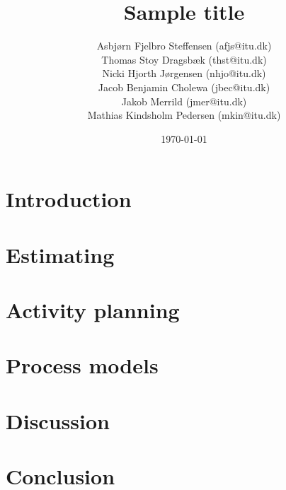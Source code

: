 \documentclass{report}
\title{Sample title}
\date{\today}
\author{Asbj\o rn Fjelbro Steffensen (afjs@itu.dk)\\ Thomas Stoy Dragsb\ae k (thst@itu.dk)\\ Nicki Hjorth J\o rgensen (nhjo@itu.dk)\\ Jacob Benjamin Cholewa (jbec@itu.dk)\\ Jakob Merrild (jmer@itu.dk)\\ Mathias Kindsholm Pedersen (mkin@itu.dk)}
\begin{document}
\maketitle
\newpage
\tableofcontents
\newpage

\chapter{Introduction}


\chapter{Estimating}

\chapter{Activity planning}






\chapter{Process models}


\chapter{Discussion}

\chapter{Conclusion}
\end{document}
